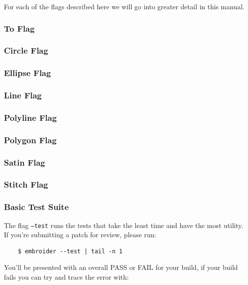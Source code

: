 \documentclass[a4paper, 11pt]{report}
\begin{document}
For each of the flags described here we will go into greater detail in this manual.

\subsubsection{To Flag}

\subsubsection{Circle Flag}

\subsubsection{Ellipse Flag}

\subsubsection{Line Flag}

\subsubsection{Polyline Flag}

\subsubsection{Polygon Flag}

\subsubsection{Satin Flag}

\subsubsection{Stitch Flag}

\subsubsection{Basic Test Suite}

The flag \texttt{--test} runs the tests that take the least time and have the most utility. If you're submitting a patch for review, please run:

\begin{verbatim}
    $ embroider --test | tail -n 1
\end{verbatim}

You'll be presented with an overall PASS or FAIL for your build,
if your build fails you can try and trace the error with:
\end{document}
